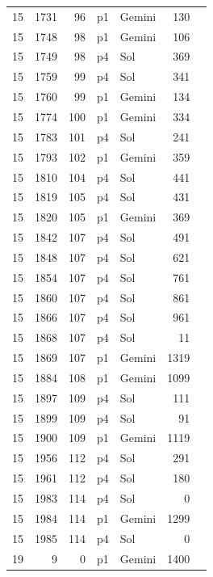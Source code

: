 \begin{longtable}{r r r l l r L{2.3in}}
15 & 1731 & 96 & p1 & Gemini & 130 &  \\
15 & 1748 & 98 & p1 & Gemini & 106 &  \\
15 & 1749 & 98 & p4 & Sol & 369 &  \\
15 & 1759 & 99 & p4 & Sol & 341 &  \\
15 & 1760 & 99 & p1 & Gemini & 134 &  \\
15 & 1774 & 100 & p1 & Gemini & 334 &  \\
15 & 1783 & 101 & p4 & Sol & 241 &  \\
15 & 1793 & 102 & p1 & Gemini & 359 &  \\
15 & 1810 & 104 & p4 & Sol & 441 &  \\
15 & 1819 & 105 & p4 & Sol & 431 &  \\
15 & 1820 & 105 & p1 & Gemini & 369 &  \\
15 & 1842 & 107 & p4 & Sol & 491 &  \\
15 & 1848 & 107 & p4 & Sol & 621 &  \\
15 & 1854 & 107 & p4 & Sol & 761 &  \\
15 & 1860 & 107 & p4 & Sol & 861 &  \\
15 & 1866 & 107 & p4 & Sol & 961 &  \\
15 & 1868 & 107 & p4 & Sol & 11 &  \\
15 & 1869 & 107 & p1 & Gemini & 1319 &  \\
15 & 1884 & 108 & p1 & Gemini & 1099 &  \\
15 & 1897 & 109 & p4 & Sol & 111 &  \\
15 & 1899 & 109 & p4 & Sol & 91 &  \\
15 & 1900 & 109 & p1 & Gemini & 1119 &  \\
15 & 1956 & 112 & p4 & Sol & 291 &  \\
15 & 1961 & 112 & p4 & Sol & 180 &  \\
15 & 1983 & 114 & p4 & Sol & 0 &  \\
15 & 1984 & 114 & p1 & Gemini & 1299 &  \\
15 & 1985 & 114 & p4 & Sol & 0 &  \\
19 & 9 & 0 & p1 & Gemini & 1400 &  \\

\end{longtable}
